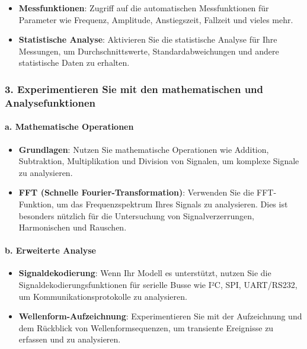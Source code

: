 \documentclass{vorlage-design-main}
\begin{document}
\begin{itemize}

\item
  \textbf{Messfunktionen}: Zugriff auf die automatischen Messfunktionen
  für Parameter wie Frequenz, Amplitude, Anstiegszeit, Fallzeit und
  vieles mehr.
\item
  \textbf{Statistische Analyse}: Aktivieren Sie die statistische Analyse
  für Ihre Messungen, um Durchschnittswerte, Standardabweichungen und
  andere statistische Daten zu erhalten.
\end{itemize}

\hypertarget{experimentieren-sie-mit-den-mathematischen-und-analysefunktionen}{%
\subsubsection{3. Experimentieren Sie mit den mathematischen und
Analysefunktionen}\label{experimentieren-sie-mit-den-mathematischen-und-analysefunktionen}}

\hypertarget{a.-mathematische-operationen}{%
\paragraph{a. Mathematische
Operationen}\label{a.-mathematische-operationen}}

\begin{itemize}

\item
  \textbf{Grundlagen}: Nutzen Sie mathematische Operationen wie
  Addition, Subtraktion, Multiplikation und Division von Signalen, um
  komplexe Signale zu analysieren.
\item
  \textbf{FFT (Schnelle Fourier-Transformation)}: Verwenden Sie die
  FFT-Funktion, um das Frequenzspektrum Ihres Signals zu analysieren.
  Dies ist besonders nützlich für die Untersuchung von
  Signalverzerrungen, Harmonischen und Rauschen.
\end{itemize}

\hypertarget{b.-erweiterte-analyse}{%
\paragraph{b. Erweiterte Analyse}\label{b.-erweiterte-analyse}}

\begin{itemize}

\item
  \textbf{Signaldekodierung}: Wenn Ihr Modell es unterstützt, nutzen Sie
  die Signaldekodierungsfunktionen für serielle Busse wie I²C, SPI,
  UART/RS232, um Kommunikationsprotokolle zu analysieren.
\item
  \textbf{Wellenform-Aufzeichnung}: Experimentieren Sie mit der
  Aufzeichnung und dem Rückblick von Wellenformsequenzen, um transiente
  Ereignisse zu erfassen und zu analysieren.
\end{itemize}
\end{document}
